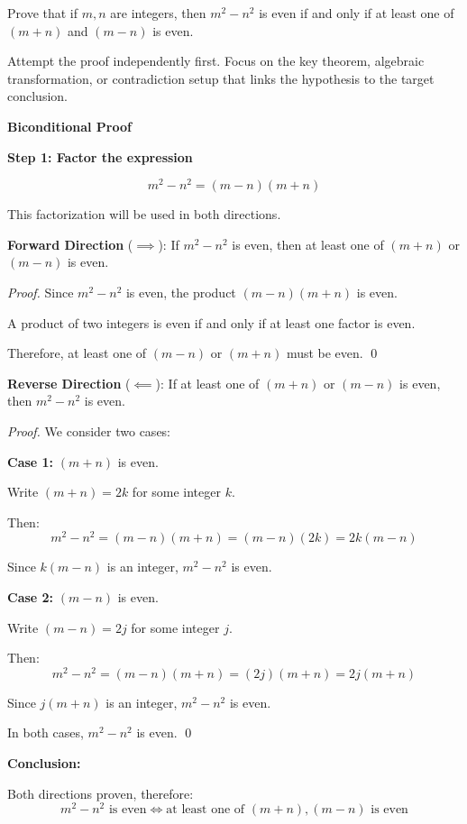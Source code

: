 
\begin{problem}
Prove that if $m, n$ are integers, then $m^2 - n^2$ is even if and only if at least one of $(m+n)$ and $(m-n)$ is even.
\end{problem}

\begin{hint}
Attempt the proof independently first. Focus on the key theorem, algebraic transformation, or contradiction setup that links the hypothesis to the target conclusion.
\end{hint}

\begin{solution}
\textbf{Biconditional Proof}

\textbf{Step 1: Factor the expression}

\[ m^2 - n^2 = (m-n)(m+n) \]

This factorization will be used in both directions.

\vspace{0.5em}
\textbf{Forward Direction} ($\implies$): If $m^2 - n^2$ is even, then at least one of $(m+n)$ or $(m-n)$ is even.

\begin{proof}
Since $m^2 - n^2$ is even, the product $(m-n)(m+n)$ is even.

A product of two integers is even if and only if at least one factor is even.

Therefore, at least one of $(m-n)$ or $(m+n)$ must be even. \qed
\end{proof}

\vspace{0.5em}
\textbf{Reverse Direction} ($\impliedby$): If at least one of $(m+n)$ or $(m-n)$ is even, then $m^2 - n^2$ is even.

\begin{proof}
We consider two cases:

\textbf{Case 1:} $(m+n)$ is even.

Write $(m+n) = 2k$ for some integer $k$.

Then:
\[ m^2 - n^2 = (m-n)(m+n) = (m-n)(2k) = 2k(m-n) \]

Since $k(m-n)$ is an integer, $m^2 - n^2$ is even.

\textbf{Case 2:} $(m-n)$ is even.

Write $(m-n) = 2j$ for some integer $j$.

Then:
\[ m^2 - n^2 = (m-n)(m+n) = (2j)(m+n) = 2j(m+n) \]

Since $j(m+n)$ is an integer, $m^2 - n^2$ is even.

In both cases, $m^2 - n^2$ is even. \qed
\end{proof}

\vspace{0.5em}
\textbf{Conclusion:}

Both directions proven, therefore:
\[ m^2 - n^2 \text{ is even} \iff \text{at least one of } (m+n), (m-n) \text{ is even} \]
\end{solution}

